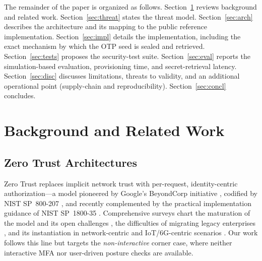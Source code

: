 \documentclass[journal]{IEEEtran}
\begin{document}
The remainder of the paper is organized as follows.
Section~\ref{sec:related} reviews background and related work.
Section~\ref{sec:threat} states the threat model.
Section~\ref{sec:arch} describes the architecture and its mapping to the public
reference implementation.
Section~\ref{sec:impl} details the implementation, including the exact
mechanism by which the OTP seed is sealed and retrieved.
Section~\ref{sec:tests} proposes the security-test suite.
Section~\ref{sec:eval} reports the simulation-based evaluation, provisioning
time, and secret-retrieval latency.
Section~\ref{sec:disc} discusses limitations, threats to validity, and an
additional operational point (supply-chain and reproducibility).
Section~\ref{sec:concl} concludes.

\section{Background and Related Work}\label{sec:related}

\subsection{Zero Trust Architectures}
Zero Trust replaces implicit network trust with per-request, identity-centric
authorization---a model pioneered by Google's BeyondCorp initiative
\cite{ward2014beyondcorp}, codified by NIST SP~800-207 \cite{nist800207}, and
recently complemented by the practical implementation guidance of NIST
SP~1800-35 \cite{nist1800_35}. Comprehensive surveys chart the maturation of
the model and its open challenges \cite{syed2022ztasurvey,he2022ztasurvey,
gambo2025ztaslr}, the difficulties of migrating legacy enterprises
\cite{teerakanok2021}, and its instantiation in network-centric and
IoT/6G-centric scenarios \cite{dhiman2024zerotrust,nahar2024zta6g}. Our work
follows this line but targets the \emph{non-interactive} corner case, where
neither interactive MFA nor user-driven posture checks are available.
\end{document}
